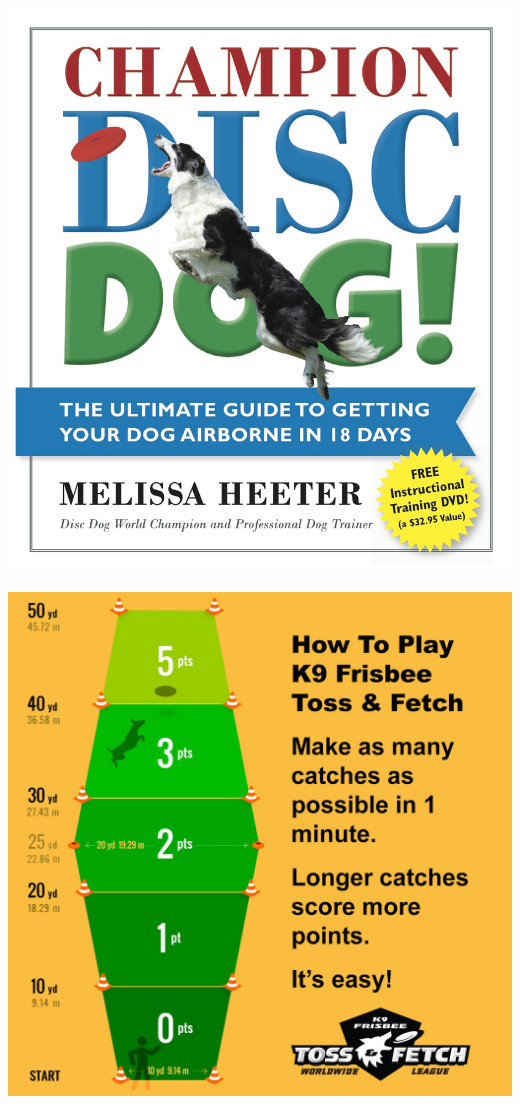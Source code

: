 \documentclass{beamer}
\begin{document}
    \begin{frame}
        \centering
        \includegraphics[height=.95\textheight]{static/discdog_book.jpg}
    \end{frame}

    \begin{frame}
        \centering
        \includegraphics[height=.95\textheight]{static/toss_and_fetch.jpg}
    \end{frame}
\end{document}
